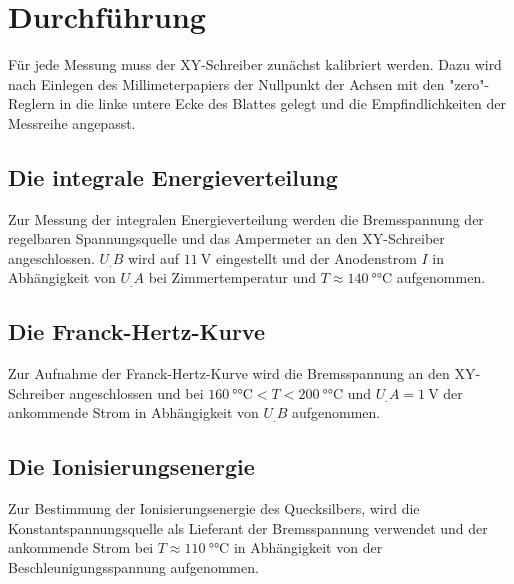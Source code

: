 \section{Durchführung}
\label{sec:Durchführung}
Für jede Messung muss der XY-Schreiber zunächst kalibriert werden. Dazu wird nach Einlegen des Millimeterpapiers der Nullpunkt der Achsen mit den "zero"-Reglern in die linke untere Ecke des Blattes gelegt und die Empfindlichkeiten der Messreihe angepasst.
\subsection{Die integrale Energieverteilung}
Zur Messung der integralen Energieverteilung werden die Bremsspannung der regelbaren Spannungsquelle und das Ampermeter an den XY-Schreiber angeschlossen. $U_.B$ wird auf $\SI{11}{\volt}$ eingestellt und der Anodenstrom $I$ in Abhängigkeit von $U_.A$ bei Zimmertemperatur und $T\approx \SI{140}{\degree\celsius}$ aufgenommen.
\subsection{Die Franck-Hertz-Kurve}
Zur Aufnahme der Franck-Hertz-Kurve wird die Bremsspannung an den XY-Schreiber angeschlossen und bei $\SI{160}{\degree\celsius}<T<\SI{200}{\degree\celsius}$ und $U_.A=\SI{1}{\volt}$
der ankommende Strom in Abhängigkeit von $U_.B$ aufgenommen.
\subsection{Die Ionisierungsenergie}
Zur Bestimmung der Ionisierungsenergie des Quecksilbers, wird die Konstantspannungsquelle als Lieferant der Bremsspannung verwendet und der ankommende Strom bei $T\approx\SI{110}{\degree\celsius}$ in Abhängigkeit von der Beschleunigungsspannung aufgenommen.